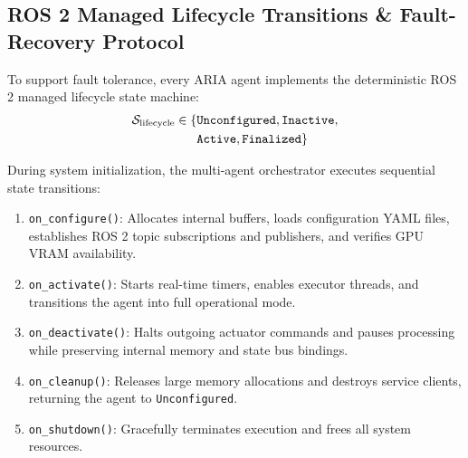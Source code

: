 \documentclass[journal]{IEEEtran}
\begin{document}
\subsection{ROS 2 Managed Lifecycle Transitions \& Fault-Recovery Protocol}
To support fault tolerance, every ARIA agent implements the deterministic ROS 2 managed lifecycle state machine:
\begin{equation}
\begin{split}
\mathcal{S}_{\text{lifecycle}} \in \{ &\text{\texttt{Unconfigured}}, \text{\texttt{Inactive}}, \\
&\text{\texttt{Active}}, \text{\texttt{Finalized}} \}
\end{split}
\end{equation}

During system initialization, the multi-agent orchestrator executes sequential state transitions:
\begin{enumerate}
    \item \texttt{on\_configure()}: Allocates internal buffers, loads configuration YAML files, establishes ROS 2 topic subscriptions and publishers, and verifies GPU VRAM availability.
    \item \texttt{on\_activate()}: Starts real-time timers, enables executor threads, and transitions the agent into full operational mode.
    \item \texttt{on\_deactivate()}: Halts outgoing actuator commands and pauses processing while preserving internal memory and state bus bindings.
    \item \texttt{on\_cleanup()}: Releases large memory allocations and destroys service clients, returning the agent to \texttt{Unconfigured}.
    \item \texttt{on\_shutdown()}: Gracefully terminates execution and frees all system resources.
\end{enumerate}
\end{document}

